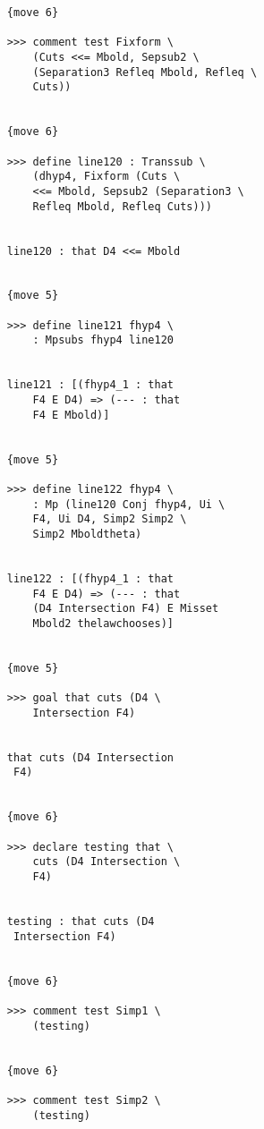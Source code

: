 \documentclass[12pt]{article}
\begin{document}
\begin{verbatim}
                  {move 6}

                  >>> comment test Fixform \
                      (Cuts <<= Mbold, Sepsub2 \
                      (Separation3 Refleq Mbold, Refleq \
                      Cuts))


                  {move 6}

                  >>> define line120 : Transsub \
                      (dhyp4, Fixform (Cuts \
                      <<= Mbold, Sepsub2 (Separation3 \
                      Refleq Mbold, Refleq Cuts)))


                  line120 : that D4 <<= Mbold


                  {move 5}

                  >>> define line121 fhyp4 \
                      : Mpsubs fhyp4 line120


                  line121 : [(fhyp4_1 : that 
                      F4 E D4) => (--- : that 
                      F4 E Mbold)]


                  {move 5}

                  >>> define line122 fhyp4 \
                      : Mp (line120 Conj fhyp4, Ui \
                      F4, Ui D4, Simp2 Simp2 \
                      Simp2 Mboldtheta)


                  line122 : [(fhyp4_1 : that 
                      F4 E D4) => (--- : that 
                      (D4 Intersection F4) E Misset 
                      Mbold2 thelawchooses)]


                  {move 5}

                  >>> goal that cuts (D4 \
                      Intersection F4)


                  that cuts (D4 Intersection 
                   F4)


                  {move 6}

                  >>> declare testing that \
                      cuts (D4 Intersection \
                      F4)


                  testing : that cuts (D4 
                   Intersection F4)


                  {move 6}

                  >>> comment test Simp1 \
                      (testing)


                  {move 6}

                  >>> comment test Simp2 \
                      (testing)



\end{verbatim}
\end{document}
